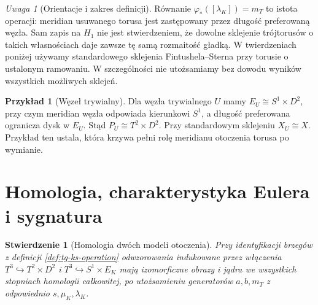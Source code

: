 \documentclass[11pt,a4paper]{report}
\numberwithin{equation}{section}
\theoremstyle{plain}
\newtheorem{stwierdzenie}[twierdzenie]{Stwierdzenie}
\theoremstyle{definition}
\newtheorem{przyklad}[twierdzenie]{Przykład}
\theoremstyle{remark}
\newtheorem{uwaga}[twierdzenie]{Uwaga}
\begin{document}
\begin{uwaga}[Orientacje i zakres definicji]
Równanie $\varphi_*([\lambda_K])=m_T$ to istota
operacji: meridian usuwanego torusa jest zastępowany
przez długość preferowaną węzła. Sam zapis na $H_1$
nie jest stwierdzeniem, że dowolne sklejenie trójtorusów
o takich własnościach daje zawsze tę samą rozmaitość
gładką. W twierdzeniach poniżej używamy standardowego
sklejenia Fintushela--Sterna przy torusie o ustalonym
ramowaniu. W szczególności nie utożsamiamy bez dowodu
wyników wszystkich możliwych sklejeń.
\end{uwaga}

\begin{center}
\end{center}

\begin{przyklad}[Węzeł trywialny]
Dla węzła trywialnego $U$ mamy $E_U\cong S^1\times D^2$,
przy czym meridian węzła odpowiada kierunkowi $S^1$,
a długość preferowana ogranicza dysk w $E_U$.
Stąd $P_U\cong T^2\times D^2$. Przy standardowym sklejeniu
$X_U\cong X$. Przykład ten ustala, która krzywa
pełni rolę meridianu otoczenia torusa po wymianie.
\end{przyklad}

\section{Homologia, charakterystyka Eulera i sygnatura}
\label{sec:tg-ks-homology}

\begin{stwierdzenie}[Homologia dwóch modeli otoczenia]
\label{prop:tg-ks-boundary-maps}
Przy identyfikacji brzegów z definicji
\ref{def:tg-ks-operation} odwzorowania indukowane
przez włączenia $T^3\hookrightarrow T^2\times D^2$
i $T^3\hookrightarrow S^1\times E_K$ mają izomorficzne
obrazy i jądra we wszystkich stopniach homologii
całkowitej, po utożsamieniu generatorów $a,b,m_T$
z odpowiednio $s,\mu_K,\lambda_K$.
\end{stwierdzenie}
\end{document}
